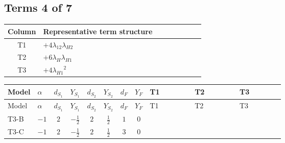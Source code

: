 \documentclass[8pt]{article}
\begin{document}
\begin{landscape}
\subsection*{Terms 4 of 7}
\begin{center}
\begin{tabular}{@{}c >{\raggedright\arraybackslash}p{0.82\linewidth}@{}}
\toprule
Column & Representative term structure \\
\midrule
T1 & \(\displaystyle +4 {\lambda_{12}} {\lambda_{H2}}\) \\
\midrule
T2 & \(\displaystyle +6 {\lambda_H} {\lambda_{H1}}\) \\
\midrule
T3 & \(\displaystyle +4 {\lambda_{H1}}^2\) \\
\midrule
\bottomrule
\end{tabular}
\end{center}
\smallskip
\tiny
\begin{longtable}{@{}llcccccc >{\raggedright\arraybackslash}p{0.21\linewidth} >{\raggedright\arraybackslash}p{0.21\linewidth} >{\raggedright\arraybackslash}p{0.21\linewidth}@{}}
\toprule
Model & $\alpha$ & $d_{S_1}$ & $Y_{S_1}$ & $d_{S_2}$ & $Y_{S_2}$ & $d_F$ & $Y_F$ & T1 & T2 & T3 \\
\midrule
\endfirsthead
\toprule
Model & $\alpha$ & $d_{S_1}$ & $Y_{S_1}$ & $d_{S_2}$ & $Y_{S_2}$ & $d_F$ & $Y_F$ & T1 & T2 & T3 \\
\midrule
\endhead
T3-B & $-1$ & $2$ & $-\frac{1}{2}$ & $2$ & $\frac{1}{2}$ & $1$ & $0$ & \scriptsize\adjustbox{max width=\linewidth}{$\begin{gathered} +4 {\lambda_{12}} {\lambda_{H2}}\end{gathered}$} & \scriptsize\adjustbox{max width=\linewidth}{$\begin{gathered} +6 {\lambda_H} {\lambda_{H1}}\end{gathered}$} & \scriptsize\adjustbox{max width=\linewidth}{$\begin{gathered} +4 {\lambda_{H1}}^2\end{gathered}$} \\
\midrule
T3-C & $-1$ & $2$ & $-\frac{1}{2}$ & $2$ & $\frac{1}{2}$ & $3$ & $0$ & \scriptsize\adjustbox{max width=\linewidth}{$\begin{gathered} +4 {\lambda_{12}} {\lambda_{H2}}\end{gathered}$} & \scriptsize\adjustbox{max width=\linewidth}{$\begin{gathered} +6 {\lambda_H} {\lambda_{H1}}\end{gathered}$} & \scriptsize\adjustbox{max width=\linewidth}{$\begin{gathered} +4 {\lambda_{H1}}^2\end{gathered}$} \\

\end{longtable}
\end{landscape}
\end{document}
